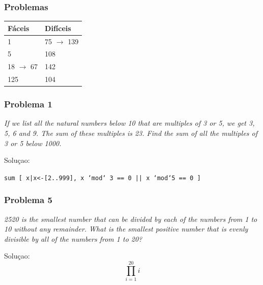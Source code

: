 \documentclass{beamer}
\begin{document}
\begin{frame}
    \frametitle{Problemas}
    \begin{table}[htpb]
        \centering
        \begin{tabular}{l | l}
            Fáceis               & Difíceis              \\ \hline
            1                    & 75 $\rightarrow$ 139  \\
            5                    & 108                   \\
            18 $\rightarrow$ 67  & 142                   \\
            125                  & 104                   \\
        \end{tabular}
    \end{table}
\end{frame}

\begin{frame}
    \frametitle{Problema 1}
    \begin{center}
        \textit{
            If we list all the natural numbers below 10 that are multiples of 3 or 5, we get 3, 5, 6 and 9. The sum of these multiples is 23.
            Find the sum of all the multiples of 3 or 5 below 1000.
        }
    \end{center}

    Soluçao:
    \begin{center}
        \texttt{sum [ x|x<-[2..999], x `mod` 3 == 0 || x `mod`5 == 0 ]}
    \end{center}

\end{frame}

\begin{frame}
    \frametitle{Problema 5}

    \begin{center}
        \textit{
            2520 is the smallest number that can be divided by each of the numbers from 1 to 10 without any remainder.
            What is the smallest positive number that is evenly divisible by all of the numbers from 1 to 20?
        }
    \end{center}

    Soluçao:
    \begin{equation}
        \prod_{i=1}^{20} i
    \end{equation}
\end{frame}
\end{document}
